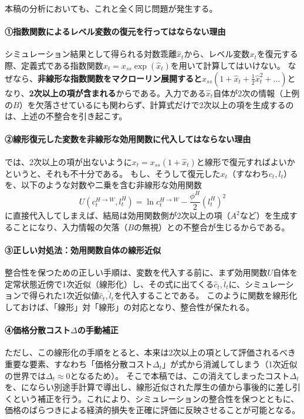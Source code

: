 本稿の分析においても、これと全く同じ問題が発生する。

\paragraph{①指数関数によるレベル変数の復元を行ってはならない理由}\label{sec:appendix_welfare_correction_consistency_p1}
シミュレーション結果として得られる対数乖離\(\hat{x}_t\)から、レベル変数\(x_t\)を復元する際、定義式である指数関数\(x_t=x_{ss}\exp(\hat{x}_t)\)を用いて計算してはいけない。
なぜなら、\textbf{非線形な指数関数をマクローリン展開すると}\(x_{ss}(1+\hat{x}_t+\frac{1}{2}\hat{x}_t^2+\dots)\)となり、\textbf{2次以上の項が含まれる}からである。入力である\(\hat{x}_t\)自体が2次の情報（上例の\(B\)）を欠落させているにも関わらず、計算式だけで2次以上の項を生成するのは、上述の不整合を引き起こす。

\paragraph{②線形復元した変数を非線形な効用関数に代入してはならない理由}\label{sec:appendix_welfare_correction_consistency_p2}
では、2次以上の項が出ないように\(x_t=x_{ss}(1+\hat{x}_t)\)と線形で復元すればよいかというと、それも不十分である。
もし、そうして復元した\(x_t\)（すなわち\(c_t,l_t\)）を、以下のような対数や二乗を含む非線形な効用関数
\begin{equation}
U(c_t^{H\to W},l_t^H)=\ln c_t^{H\to W}-\frac{\phi^H}{2}(l_t^H)^2
\label{eq:appendix_welfare_correction_consistency_utility_nonlinear}
\end{equation}
に直接代入してしまえば、結局は効用関数側が2次以上の項（\(A^2\)など）を生成することになり、入力情報の欠落（\(B\)の無視）との不整合が生じるからである。

\paragraph{③正しい対処法：効用関数自体の線形近似}\label{sec:appendix_welfare_correction_consistency_p3}
整合性を保つための正しい手順は、変数を代入する前に、まず効用関数\(U\)自体を定常状態近傍で1次近似（線形化）し、その式に出てくる\(\hat{c}_t,\hat{l}_t\)に、シミュレーションで得られた1次近似値\(\hat{c}_t,\hat{l}_t\)を代入することである。
このように関数を線形化しておけば、「線形」対「線形」の対応となり、整合性が保たれる。

\paragraph{④価格分散コスト\(\Delta\)の手動補正}\label{sec:appendix_welfare_correction_consistency_p4}
ただし、この線形化の手順をとると、本来は2次以上の項として評価されるべき重要な要素、すなわち「価格分散コスト\(\Delta_t\)」が式から消滅してしまう（1次近似の世界では\(\Delta_t\approx0\)となるため）。
そこで本稿では、この消えてしまったコスト\(\Delta_t\)を、\textcite{Woodford2003}にならい別途手計算で導出し、線形近似された厚生の値から事後的に差し引くという補正を行う。これにより、シミュレーションの整合性を保つとともに、価格のばらつきによる経済的損失を正確に評価に反映させることが可能となる。

